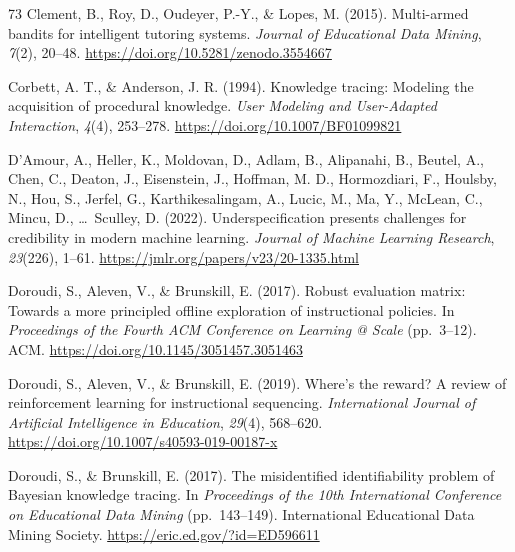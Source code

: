\documentclass[a4paper,preprint,12pt,authoryear]{elsarticle}
\begin{document}
\begin{thebibliography}{73}
Clement, B., Roy, D., Oudeyer, P.-Y., \& Lopes, M. (2015). Multi-armed bandits for intelligent tutoring systems. \textit{Journal of Educational Data Mining}, \textit{7}(2), 20--48. \url{https://doi.org/10.5281/zenodo.3554667}

Corbett, A. T., \& Anderson, J. R. (1994). Knowledge tracing: Modeling the acquisition of procedural knowledge. \textit{User Modeling and User-Adapted Interaction}, \textit{4}(4), 253--278. \url{https://doi.org/10.1007/BF01099821}

D'Amour, A., Heller, K., Moldovan, D., Adlam, B., Alipanahi, B., Beutel, A., Chen, C., Deaton, J., Eisenstein, J., Hoffman, M. D., Hormozdiari, F., Houlsby, N., Hou, S., Jerfel, G., Karthikesalingam, A., Lucic, M., Ma, Y., McLean, C., Mincu, D., \ldots\ Sculley, D. (2022). Underspecification presents challenges for credibility in modern machine learning. \textit{Journal of Machine Learning Research}, \textit{23}(226), 1--61. \url{https://jmlr.org/papers/v23/20-1335.html}

Doroudi, S., Aleven, V., \& Brunskill, E. (2017). Robust evaluation matrix: Towards a more principled offline exploration of instructional policies. In \textit{Proceedings of the Fourth ACM Conference on Learning @ Scale} (pp.~3--12). ACM. \url{https://doi.org/10.1145/3051457.3051463}

Doroudi, S., Aleven, V., \& Brunskill, E. (2019). Where's the reward? A review of reinforcement learning for instructional sequencing. \textit{International Journal of Artificial Intelligence in Education}, \textit{29}(4), 568--620. \url{https://doi.org/10.1007/s40593-019-00187-x}

Doroudi, S., \& Brunskill, E. (2017). The misidentified identifiability problem of Bayesian knowledge tracing. In \textit{Proceedings of the 10th International Conference on Educational Data Mining} (pp.~143--149). International Educational Data Mining Society. \url{https://eric.ed.gov/?id=ED596611}


\end{thebibliography}
\end{document}
